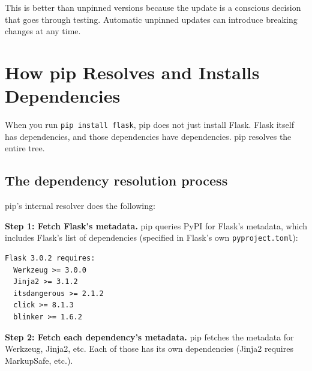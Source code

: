 This is better than unpinned versions because the update is a conscious decision that goes through testing. Automatic unpinned updates can introduce breaking changes at any time.

\setcounter{section}{2}
\section{How pip Resolves and Installs Dependencies}\label{12-dependency-declaration:123-how-pip-resolves-and-installs-dependencies}

When you run \texttt{pip\ install\ flask}, pip does not just install Flask. Flask itself has dependencies, and those dependencies have dependencies. pip resolves the entire tree.

\subsection*{The dependency resolution process}\label{12-dependency-declaration:the-dependency-resolution-process}

\begin{codebox}[short]

\begin{Shaded}
\begin{Highlighting}[]
\end{Highlighting}
\end{Shaded}

\end{codebox}

\noindent{}pip's internal resolver does the following:

\textbf{Step 1: Fetch Flask's metadata.} pip queries PyPI for Flask's metadata, which includes Flask's list of dependencies (specified in Flask's own \texttt{pyproject.toml}):

\begin{outputbox}[short]
\begin{Verbatim}[fontsize=\codesize, breaklines, breakanywhere, breaksymbolleft={\tiny\textcolor{muted}{$\hookrightarrow$}}]
Flask 3.0.2 requires:
  Werkzeug >= 3.0.0
  Jinja2 >= 3.1.2
  itsdangerous >= 2.1.2
  click >= 8.1.3
  blinker >= 1.6.2
\end{Verbatim}
\end{outputbox}

\noindent{}\textbf{Step 2: Fetch each dependency's metadata.} pip fetches the metadata for Werkzeug, Jinja2, etc. Each of those has its own dependencies (Jinja2 requires MarkupSafe, etc.).

